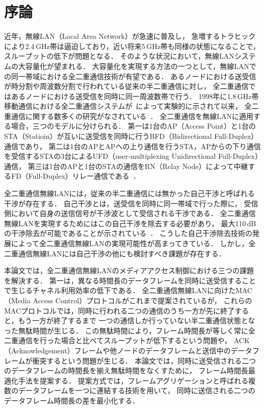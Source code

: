 \documentclass[master]{kuisthesis}		%
\begin{document}
\section{序論} \label{sec:intro}
近年，無線LAN（Local Area Network）が急速に普及し，
急増するトラヒックにより2.4\,GHz帯は逼迫しており，近い将来5\,GHz帯も同様の状態になることで，
スループットの低下が問題となる．
そのような状況において，無線LANシステムの大容量化が望まれる．
大容量化を実現する方法の一つとして，無線LANでの同一帯域における全二重通信技術が有望である．
あるノードにおける送受信が時分割や周波数分割で行われている従来の半二重通信に対し，
全二重通信ではあるノードにおける送受信を同時に同一周波数帯で行う．
1998年に1.8\,GHz帯移動通信における全二重通信システムが~\cite{fdstart}によって実験的に示されて以来，
全二重通信に関する数多くの研究がなされている~\cite{adhocfd,achifd,realtimefd,asynfd,baifd}．
全二重通信を無線LANに適用する場合，三つのモデルに分けられる．
第一は1台のAP（Access Point）と1台のSTA（Statioin）が互いに送受信を同時に行うBFD（Bidirectional Full-Duplex）通信であり，
第二は1台のAPとAPへの上り通信を行うSTA，APからの下り通信を受信するSTAの3台によるUFD（user-multiplexing Unidirectional Full-Duplex）通信，
第三は1台のAPと1台のSTAの通信をRN（Relay Node）によって中継するFD（Full-Duplex）リレー通信である~\cite{fdsurvey}．
\par
全二重通信無線LANには，従来の半二重通信には無かった自己干渉と呼ばれる干渉が存在する．
自己干渉とは，送受信を同時に同一帯域で行った際に，
受信側において自身の送信信号が干渉波として受信される干渉である．
全二重通信無線LANを実現するためにはこの自己干渉を除去する必要があり，
最大110\,dBの干渉除去が可能であることが示されている~\cite{stanford1,fdmac}．
こうした自己干渉除去技術の発展によって全二重通信無線LANの実現可能性が高まってきている．
しかし，全二重通信無線LANには自己干渉の他にも検討すべき課題が存在する．

\par
本論文では，全二重通信無線LANのメディアアクセス制御における三つの課題を解決する．
第一は，異なる時間長のデータフレームを同時に送受信することで生じるチャネル利用効率の低下である．
全二重通信無線LANに向けたMAC（Media Access Control）プロトコル\cite{fdmac,contra,janus}がこれまで提案されているが，
これらのMACプロトコルでは，同時に行われる二つの通信のうち一方が先に終了すると，もう一方が終了するまで
一つの通信しか行っていない半二重通信状態となった無駄時間が生じる．
この無駄時間により，フレーム時間長が等しく常に全二重通信を行った場合と比べてスループットが低下するという問題や，
ACK（Acknowledgement）フレームや他ノードのデータフレームと送信中のデータフレームが衝突するという問題が生じる．
本論文では，同時に送受信される二つのデータフレームの時間長を揃え無駄時間をなくすために，
フレーム時間長最適化手法を提案する．
提案方式では，フレームアグリゲーションと呼ばれる複数のデータフレームを一つに連結する技術を用いて，
同時に送信される二つのデータフレーム時間長の差を最小化する．
\end{document}
